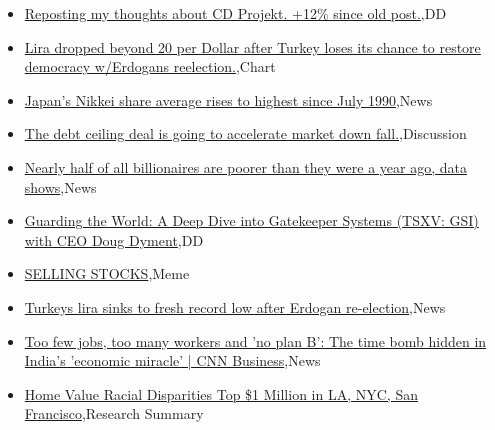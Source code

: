 \documentclass{article}%
\begin{document}
%
\begin{itemize}%
\item%
\href{https://reddit.com/r/wallstreetbets/comments/13uoj90/reposting\_my\_thoughts\_about\_cd\_projekt\_12\_since/}{Reposting my thoughts about CD Projekt. +12\% since old post.},DD%
\item%
\href{https://reddit.com/r/wallstreetbets/comments/13uock7/lira\_dropped\_beyond\_20\_per\_dollar\_after\_turkey/}{Lira dropped beyond 20 per Dollar after Turkey loses its chance to restore democracy w/Erdogans reelection.},Chart%
\item%
\href{https://reddit.com/r/wallstreetbets/comments/13umdci/japans\_nikkei\_share\_average\_rises\_to\_highest/}{Japan's Nikkei share average rises to highest since July 1990},News%
\item%
\href{https://reddit.com/r/wallstreetbets/comments/13ujd1z/the\_debt\_ceiling\_deal\_is\_going\_to\_accelerate/}{The debt ceiling deal is going to accelerate market down fall.},Discussion%
\item%
\href{https://reddit.com/r/wallstreetbets/comments/13ugkow/nearly\_half\_of\_all\_billionaires\_are\_poorer\_than/}{Nearly half of all billionaires are poorer than they were a year ago, data shows},News%
\item%
\href{https://reddit.com/r/Baystreetbets/comments/13ujl3w/guarding\_the\_world\_a\_deep\_dive\_into\_gatekeeper/}{Guarding the World: A Deep Dive into Gatekeeper Systems (TSXV: GSI) with CEO Doug Dyment},DD%
\item%
\href{https://reddit.com/r/StockMarket/comments/13u1qzi/selling\_stocks/}{SELLING STOCKS},Meme%
\item%
\href{https://reddit.com/r/Economics/comments/13uqevz/turkeys\_lira\_sinks\_to\_fresh\_record\_low\_after/}{Turkeys lira sinks to fresh record low after Erdogan re-election},News%
\item%
\href{https://reddit.com/r/Economics/comments/13uqbc7/too\_few\_jobs\_too\_many\_workers\_and\_no\_plan\_b\_the/}{Too few jobs, too many workers and 'no plan B': The time bomb hidden in India's 'economic miracle' | CNN Business},News%
\item%
\href{https://reddit.com/r/Economics/comments/13ugqy4/home\_value\_racial\_disparities\_top\_1\_million\_in\_la/}{Home Value Racial Disparities Top \$1 Million in LA, NYC, San Francisco},Research Summary%
\end{itemize}%
\end{document}
